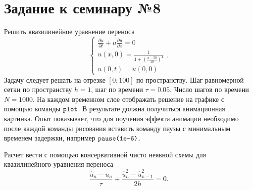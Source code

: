 \section{Задание к семинару №8}
Решить квазилинейное уравнение переноса
\begin{equation} \label{c8eq1}
	\begin{cases}
		\displaystyle \frac{\partial u}{\partial t} + u \frac{\partial u}{\partial x} = 0 \\
		\displaystyle u(x,0) = \frac{1}{1 + \left( \displaystyle \frac{x-50}{10} \right)^4} \\
		u(0,t) = u(0,0) 
	\end{cases}.
\end{equation}
Задачу следует решать на отрезке $[0; 100]$ по пространству. Шаг равномерной сетки по пространству $h = 1$, шаг по времени $\tau = 0.05$. Число шагов по времени $N = 1000$. На каждом временном слое отображать решение на графике с помощью команды $\texttt{\lstinline|plot|}$. В результате должна получиться анимационная картинка. Опыт показывает, что для поучения эффекта анимации необходимо после каждой команды рисования вставить команду паузы с минимальным временем задержки, например $\texttt{\lstinline|pause(1e-6)|}$.

Расчет вести с помощью консервативной чисто неявной схемы для квазилинейного уравнения переноса
\begin{equation} \label{c8eq2}
	\frac{\hat{u}_n - u_n}{\tau} + \frac{\hat{u}^2_n - \hat{u}^2_{n-1}}{2h} = 0.	
\end{equation}



